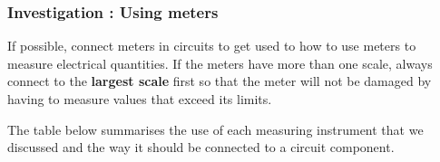             \subsubsection{  Investigation : Using meters }
            \nopagebreak
            
        \label{m38773*id67868}If possible,
connect meters in circuits to get used to how to use meters to
measure electrical quantities. If the meters have more than one
scale, always connect to the \textbf{largest scale} first so that the meter
will not be damaged by having to measure values that exceed its
limits. \par 

        \label{m38773*id67887}The table below summarises the use of each measuring instrument
that we discussed and the way it should be connected to a circuit
component.\par 
        
    
      
    
    \setlength\mytablespace{6\tabcolsep}
    \addtolength\mytablespace{4\arrayrulewidth}
    \setlength\mytablewidth{\linewidth}
        
    
    \setlength\mytableroom{\mytablewidth}
    \addtolength\mytableroom{-\mytablespace}
    
    \setlength\myfixedwidth{0pt}
    \setlength\mystarwidth{\mytableroom}
        \addtolength\mystarwidth{-\myfixedwidth}
        \divide{}
        
